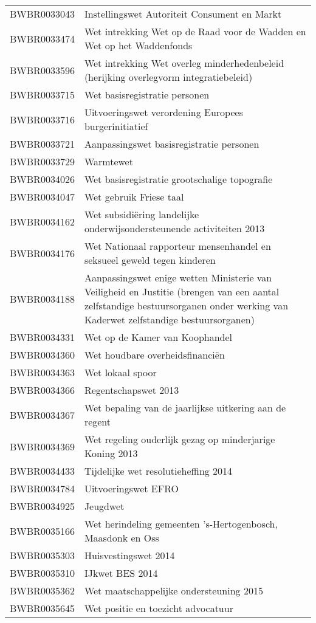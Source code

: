 \begin{longtable}{lp{}}
BWBR0033043 & Instellingswet Autoriteit Consument en Markt \\
BWBR0033474 & Wet intrekking Wet op de Raad voor de Wadden en Wet op het Waddenfonds \\
BWBR0033596 & Wet intrekking Wet overleg minderhedenbeleid (herijking overlegvorm integratiebeleid) \\
BWBR0033715 & Wet basisregistratie personen \\
BWBR0033716 & Uitvoeringswet verordening Europees burgerinitiatief \\
BWBR0033721 & Aanpassingswet basisregistratie personen \\
BWBR0033729 & Warmtewet  \\
BWBR0034026 & Wet basisregistratie grootschalige topografie \\
BWBR0034047 & Wet gebruik Friese taal \\
BWBR0034162 & Wet subsidiëring landelijke onderwijsondersteunende activiteiten 2013 \\
BWBR0034176 & Wet Nationaal rapporteur mensenhandel en seksueel geweld tegen kinderen \\
BWBR0034188 & Aanpassingswet enige wetten Ministerie van Veiligheid en Justitie (brengen van een aantal zelfstandige bestuursorganen onder werking van Kaderwet zelfstandige bestuursorganen) \\
BWBR0034331 & Wet op de Kamer van Koophandel \\
BWBR0034360 & Wet houdbare overheidsfinanciën \\
BWBR0034363 & Wet lokaal spoor \\
BWBR0034366 & Regentschapswet 2013 \\
BWBR0034367 & Wet bepaling van de jaarlijkse uitkering aan de regent \\
BWBR0034369 & Wet regeling ouderlijk gezag op minderjarige Koning 2013  \\
BWBR0034433 & Tijdelijke wet resolutieheffing 2014 \\
BWBR0034784 & Uitvoeringswet EFRO \\
BWBR0034925 & Jeugdwet \\
BWBR0035166 & Wet herindeling gemeenten 's-Hertogenbosch, Maasdonk en Oss \\
BWBR0035303 & Huisvestingswet 2014 \\
BWBR0035310 & IJkwet BES 2014 \\
BWBR0035362 & Wet maatschappelijke ondersteuning 2015  \\
BWBR0035645 & Wet positie en toezicht advocatuur \\

\end{longtable}
